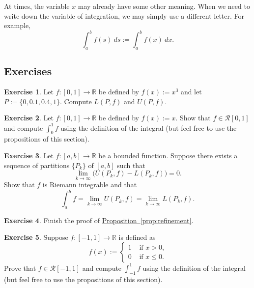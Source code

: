 \documentclass[12pt]{book}
\newcommand{\R}{{\mathbb{R}}}
\newcommand{\sR}{{\mathcal{R}}}
\theoremstyle{plain}
\theoremstyle{remark}
\theoremstyle{definition}
\theoremstyle{exercise}
\newtheorem{exercise}{Exercise}[section]
\theoremstyle{example}
\newcommand{\propref}[1]{\hyperref[#1]{Proposition~\ref*{#1}}}
\begin{document}
At times, the variable $x$ may already have some other meaning.  When
we need to write down the variable of integration, we may simply
use a different letter.  For example,
\begin{equation*}
\int_a^b f(s)~ds := \int_a^b f(x)~dx .
\end{equation*}

\subsection{Exercises}

\begin{exercise}
Let $f \colon [0,1] \to \R$ be defined by $f(x) := x^3$
and let $P := \{ 0, 0.1, 0.4, 1 \}$.  Compute $L(P,f)$ and $U(P,f)$.
\end{exercise}

\begin{exercise}
Let $f \colon [0,1] \to \R$ be defined by $f(x) := x$.
Show that $f \in \sR[0,1]$ and
compute $\int_0^1 f$ using the definition of the integral
(but
feel free to use the propositions of this section).%
\end{exercise}

\begin{exercise}
Let $f \colon [a,b] \to \R$ be a bounded function.
Suppose there exists a sequence of partitions $\{ P_k \}$ of $[a,b]$
such that
\begin{equation*}
\lim_{k \to \infty} \bigl( U(P_k,f) - L(P_k,f) \bigr) = 0 .
\end{equation*}
Show that $f$ is Riemann integrable and that
\begin{equation*}
\int_a^b f = 
\lim_{k \to \infty} U(P_k,f)
=
\lim_{k \to \infty} L(P_k,f) .
\end{equation*}
\end{exercise}

\begin{exercise}
Finish the proof of \propref{prop:refinement}.
\end{exercise}

\begin{exercise}
Suppose $f \colon [-1,1] \to \R$ is defined as
\begin{equation*}
f(x) :=
\begin{cases}
1 & \text{ if $x > 0$,} \\
0 & \text{ if $x \leq 0$.}
\end{cases}
\end{equation*}
Prove that $f \in \sR[-1,1]$ and
compute $\int_{-1}^1 f$ using the definition of the integral
(but
feel free to use the propositions of this section).
\end{exercise}
\end{document}
